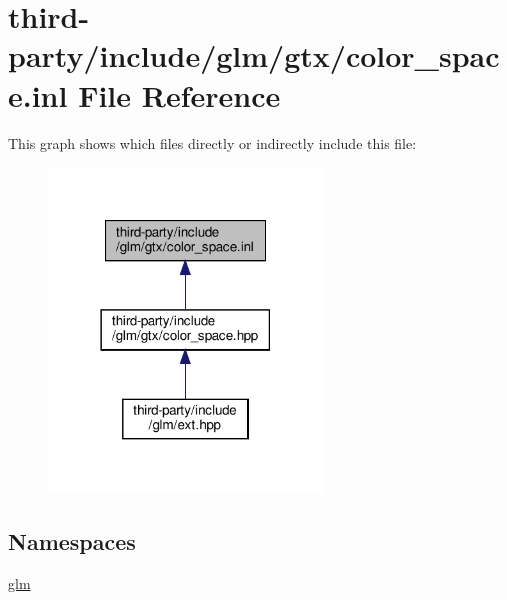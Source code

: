 \hypertarget{color__space_8inl}{}\section{third-\/party/include/glm/gtx/color\+\_\+space.inl File Reference}
\label{color__space_8inl}
This graph shows which files directly or indirectly include this file\+:
\nopagebreak
\begin{figure}[H]
\begin{center}
\leavevmode
\includegraphics[width=206pt]{color__space_8inl__dep__incl}
\end{center}
\end{figure}
\subsection*{Namespaces}
\begin{DoxyCompactItemize}
\item 
 \hyperlink{namespaceglm}{glm}
\end{DoxyCompactItemize}
